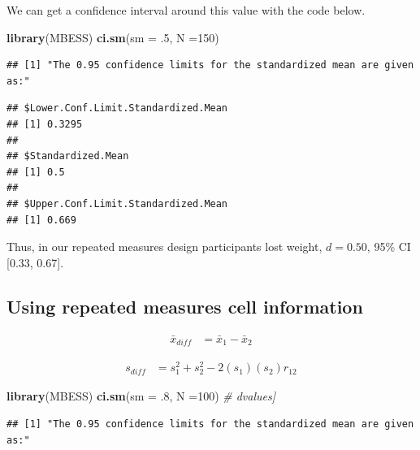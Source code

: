 \documentclass[
]{krantz}
\makeatletter
\newenvironment{Shaded}{\begin{snugshade}}{\end{snugshade}}
\newcommand{\CommentTok}[1]{\textcolor[rgb]{0.37,0.37,0.37}{\textit{#1}}}
\newcommand{\DataTypeTok}[1]{\textcolor[rgb]{0.27,0.27,0.27}{#1}}
\newcommand{\DecValTok}[1]{\textcolor[rgb]{0.06,0.06,0.06}{#1}}
\newcommand{\FloatTok}[1]{\textcolor[rgb]{0.06,0.06,0.06}{#1}}
\newcommand{\KeywordTok}[1]{\textcolor[rgb]{0.27,0.27,0.27}{\textbf{#1}}}
\newcommand{\NormalTok}[1]{#1}
\newenvironment{kframe}{%
\medskip{}
\setlength{\fboxsep}{.8em}
 \def\at@end@of@kframe{}%
 \ifinner\ifhmode%
  \def\at@end@of@kframe{\end{minipage}}%
  \begin{minipage}{\columnwidth}%
 \fi\fi%
 \def\FrameCommand##1{\hskip\@totalleftmargin \hskip-\fboxsep
 \colorbox{shadecolor}{##1}\hskip-\fboxsep
     \hskip-\linewidth \hskip-\@totalleftmargin \hskip\columnwidth}%
 \MakeFramed {\advance\hsize-\width
   \@totalleftmargin\z@ \linewidth\hsize
   \@setminipage}}%
 {\par\unskip\endMakeFramed%
 \at@end@of@kframe}
\renewenvironment{Shaded}{\begin{kframe}}{\end{kframe}}
\makeatother
\begin{document}
We can get a confidence interval around this value with the code below.

\begin{Shaded}
\begin{Highlighting}[]
\KeywordTok{library}\NormalTok{(MBESS)}
\KeywordTok{ci.sm}\NormalTok{(}\DataTypeTok{sm =} \FloatTok{.5}\NormalTok{, }\DataTypeTok{N =}\DecValTok{150}\NormalTok{) }
\end{Highlighting}
\end{Shaded}

\begin{verbatim}
## [1] "The 0.95 confidence limits for the standardized mean are given as:"
\end{verbatim}

\begin{verbatim}
## $Lower.Conf.Limit.Standardized.Mean
## [1] 0.3295
## 
## $Standardized.Mean
## [1] 0.5
## 
## $Upper.Conf.Limit.Standardized.Mean
## [1] 0.669
\end{verbatim}

Thus, in our repeated measures design participants lost weight, \(d = 0.50\), 95\% CI {[}0.33, 0.67{]}.

\hypertarget{using-repeated-measures-cell-information}{%
\subsection{Using repeated measures cell information}\label{using-repeated-measures-cell-information}}

\[
\begin{aligned}
\bar{x}_{diff} & = \bar{x}_1 - \bar{x}_2
\end{aligned}
\]

\[
\begin{aligned}
s_{diff} & = s_1^2 + s_2^2 - 2(s_1)(s_2)r_{12}
\end{aligned}
\]

\begin{Shaded}
\begin{Highlighting}[]
\KeywordTok{library}\NormalTok{(MBESS)}
\KeywordTok{ci.sm}\NormalTok{(}\DataTypeTok{sm =} \FloatTok{.8}\NormalTok{, }\DataTypeTok{N =}\DecValTok{100}\NormalTok{) }\CommentTok{# dvalues]}
\end{Highlighting}
\end{Shaded}

\begin{verbatim}
## [1] "The 0.95 confidence limits for the standardized mean are given as:"
\end{verbatim}
\end{document}
